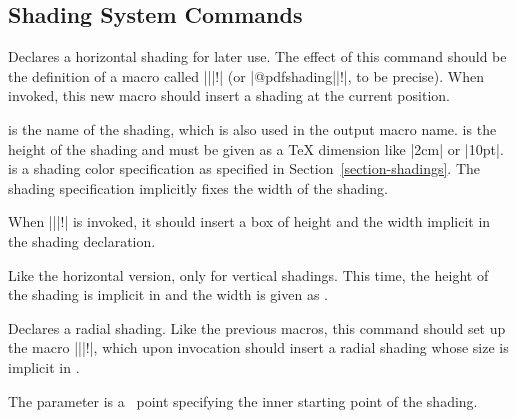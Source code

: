\subsection{Shading System Commands}

\begin{command}{\pgfsys@horishading{}}
    Declares a horizontal shading for later use. The effect of this command
    should be the definition of a macro called |\@pgfshading||!| (or
    |\csname @pdfshading||!\endcsname|, to be precise). When
    invoked, this new macro should insert a shading at the current position.

     is the name of the shading, which is also used in the output
    macro name.  is the height of the shading and must be given as
    a TeX dimension like |2cm| or |10pt|.  is a shading
    color specification as specified in Section~\ref{section-shadings}. The
    shading specification implicitly fixes the width of the shading.

    When |\@pgfshading||!| is invoked, it should insert a box of
    height  and the width implicit in the shading declaration.
\end{command}

\begin{command}{\pgfsys@vertshading{}}
    Like the horizontal version, only for vertical shadings. This time, the
    height of the shading is implicit in  and the width is
    given as .
\end{command}

\begin{command}{\pgfsys@radialshading{}}
    Declares a radial shading. Like the previous macros, this command should
    set up the macro |\@pgfshading||!|, which upon invocation should
    insert a radial shading whose size is implicit in .

    The parameter  is a \pgfname\ point specifying the
    inner starting point of the shading.
\end{command}


